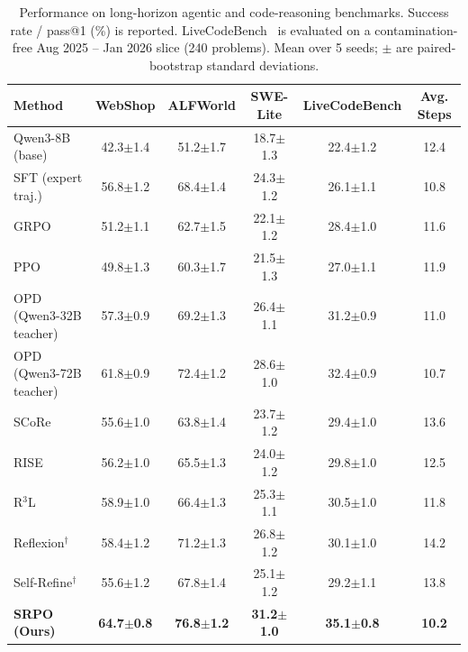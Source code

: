 \documentclass{article}
\newcommand{\method}{SRPO}
\theoremstyle{plain}
\theoremstyle{definition}
\theoremstyle{remark}
\begin{document}
\begin{table}[h]
\centering
\caption{Performance on long-horizon agentic and code-reasoning benchmarks. Success rate / pass@1 (\%) is reported. LiveCodeBench~\cite{jain2024livecodebench} is evaluated on a contamination-free Aug 2025 -- Jan 2026 slice (240 problems). Mean over 5 seeds; $\pm$ are paired-bootstrap standard deviations.}
\label{tab:agent_main_appendix}
\vspace{0.5em}
\small
\begin{tabular}{@{}lccccc@{}}
\toprule
\textbf{Method} & \textbf{WebShop} & \textbf{ALFWorld} & \textbf{SWE-Lite} & \textbf{LiveCodeBench} & \textbf{Avg. Steps} \\
\midrule
Qwen3-8B (base)                  & 42.3$\pm$1.4 & 51.2$\pm$1.7 & 18.7$\pm$1.3 & 22.4$\pm$1.2 & 12.4 \\
\midrule
SFT (expert traj.)               & 56.8$\pm$1.2 & 68.4$\pm$1.4 & 24.3$\pm$1.2 & 26.1$\pm$1.1 & 10.8 \\
GRPO                             & 51.2$\pm$1.1 & 62.7$\pm$1.5 & 22.1$\pm$1.2 & 28.4$\pm$1.0 & 11.6 \\
PPO                              & 49.8$\pm$1.3 & 60.3$\pm$1.7 & 21.5$\pm$1.3 & 27.0$\pm$1.1 & 11.9 \\
OPD (Qwen3-32B teacher)          & 57.3$\pm$0.9 & 69.2$\pm$1.3 & 26.4$\pm$1.1 & 31.2$\pm$0.9 & 11.0 \\
OPD (Qwen3-72B teacher)          & 61.8$\pm$0.9 & 72.4$\pm$1.2 & 28.6$\pm$1.0 & 32.4$\pm$0.9 & 10.7 \\
\midrule
SCoRe~\cite{SCoRe}                              & 55.6$\pm$1.0 & 63.8$\pm$1.4 & 23.7$\pm$1.2 & 29.4$\pm$1.0 & 13.6 \\
RISE~\cite{qu2024rise}                          & 56.2$\pm$1.0 & 65.5$\pm$1.3 & 24.0$\pm$1.2 & 29.8$\pm$1.0 & 12.5 \\
R$^3$L~\cite{r3l2026}                           & 58.9$\pm$1.0 & 66.4$\pm$1.3 & 25.3$\pm$1.1 & 30.5$\pm$1.0 & 11.8 \\
\midrule
Reflexion$^\dagger$              & 58.4$\pm$1.2 & 71.2$\pm$1.3 & 26.8$\pm$1.2 & 30.1$\pm$1.0 & 14.2 \\
Self-Refine$^\dagger$            & 55.6$\pm$1.2 & 67.8$\pm$1.4 & 25.1$\pm$1.2 & 29.2$\pm$1.1 & 13.8 \\
\midrule
\rowcolor{gray!15}
\textbf{\method{} (Ours)}        & \textbf{64.7$\pm$0.8} & \textbf{76.8$\pm$1.2} & \textbf{31.2$\pm$1.0} & \textbf{35.1$\pm$0.8} & \textbf{10.2} \\
\bottomrule
\end{tabular}
\end{table}
\end{document}
